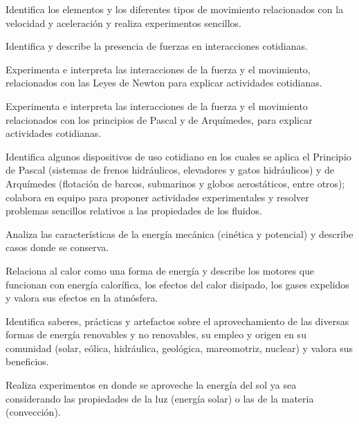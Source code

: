 \item Identifica los elementos y los diferentes tipos de movimiento relacionados con la velocidad y aceleración y realiza experimentos sencillos.
\item Identifica y describe la presencia de fuerzas en interacciones cotidianas.
\item Experimenta e interpreta las interacciones de la fuerza y el movimiento, relacionados con las Leyes de Newton para explicar actividades cotidianas.
\item Experimenta e interpreta las interacciones de la fuerza y el movimiento relacionados con los principios de Pascal y de Arquímedes, para explicar actividades cotidianas.
\item Identifica algunos dispositivos de uso cotidiano en los cuales se aplica el Principio de Pascal (sistemas de frenos hidráulicos, elevadores y gatos hidráulicos) y de Arquímedes (flotación de barcos, submarinos y globos aerostáticos, entre otros); colabora en equipo para proponer actividades experimentales y resolver problemas sencillos relativos a las propiedades de los fluidos.
\item Analiza las características de la energía mecánica (cinética y potencial) y describe casos donde se conserva.
\item Relaciona al calor como una forma de energía y describe los motores que funcionan con energía calorífica, los efectos del calor disipado, los gases expelidos y valora sus efectos en la atmósfera.
\item Identifica saberes, prácticas y artefactos sobre el aprovechamiento de las diversas formas de energía renovables y no renovables, su empleo y origen en su comunidad (solar, eólica, hidráulica, geológica, mareomotriz, nuclear) y valora sus beneficios.
\item Realiza experimentos en donde se aproveche la energía del sol ya sea considerando las propiedades de la luz (energía solar) o las de la materia (convección).